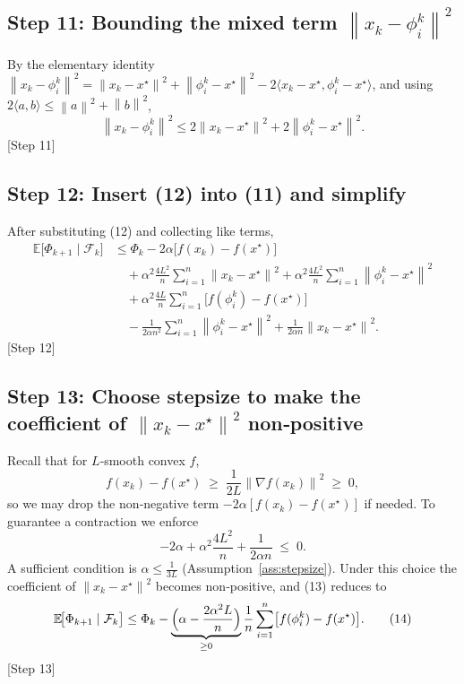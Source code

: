 \documentclass{article}
\newcommand{\E}{\mathbb{E}}
\newcommand{\norm}[1]{\left\|#1\right\|}
\newcommand{\grad}{\nabla}
\begin{document}
\subsection*{Step 11: Bounding the mixed term $\norm{x_k-\phi_i^k}^{2}$}
By the elementary identity
$\norm{x_k-\phi_i^k}^{2}
 = \norm{x_k-x^\star}^{2}
   +\norm{\phi_i^k-x^\star}^{2}
   -2\langle x_k-x^\star,\phi_i^k-x^\star\rangle$,
and using $2\langle a,b\rangle\le \norm{a}^{2}+\norm{b}^{2}$,
\[
\norm{x_k-\phi_i^k}^{2}
 \le 2\norm{x_k-x^\star}^{2}+2\norm{\phi_i^k-x^\star}^{2}. \tag{12}
\]
[Step 11]

\subsection*{Step 12: Insert (12) into (11) and simplify}
After substituting (12) and collecting like terms,
\[
\begin{aligned}
\E\!\bigl[\Phi_{k+1}\mid\mathcal{F}_k\bigr]
 &\le \Phi_k
   -2\alpha\bigl[f(x_k)-f(x^\star)\bigr] \\
 &\quad +\alpha^{2}\frac{4L^{2}}{n}\sum_{i=1}^{n}\norm{x_k-x^\star}^{2}
   +\alpha^{2}\frac{4L^{2}}{n}\sum_{i=1}^{n}\norm{\phi_i^k-x^\star}^{2}\\
 &\quad +\alpha^{2}\frac{4L}{n}\sum_{i=1}^{n}\bigl[f(\phi_i^k)-f(x^\star)\bigr] \\
 &\quad -\frac{1}{2\alpha n^{2}}\sum_{i=1}^{n}\norm{\phi_i^{k}-x^\star}^{2}
   +\frac{1}{2\alpha n}\norm{x_k-x^\star}^{2}.
\end{aligned} \tag{13}
\]
[Step 12]

\subsection*{Step 13: Choose stepsize to make the coefficient of
$\norm{x_k-x^\star}^{2}$ non‑positive}
Recall that for $L$‑smooth convex $f$,
\[
f(x_k)-f(x^\star)\;\ge\;\frac{1}{2L}\norm{\grad f(x_k)}^{2}
\;\ge\;0,
\]
so we may drop the non‑negative term $-2\alpha[f(x_k)-f(x^\star)]$ if needed.
To guarantee a contraction we enforce
\[
-2\alpha +\alpha^{2}\frac{4L^{2}}{n} +\frac{1}{2\alpha n}\;\le\;0.
\]
A sufficient condition is $\alpha\le\frac{1}{3L}$ (Assumption~\ref{ass:stepsize}).
Under this choice the coefficient of $\norm{x_k-x^\star}^{2}$ becomes
non‑positive, and (13) reduces to
\[
\E\!\bigl[\Phi_{k+1}\mid\mathcal{F}_k\bigr]
 \le \Phi_k
    -\underbrace{\Bigl(\alpha -\frac{2\alpha^{2}L}{n}\Bigr)}_{\ge 0}
      \frac{1}{n}\sum_{i=1}^{n}\bigl[f(\phi_i^k)-f(x^\star)\bigr]. \tag{14}
\]
[Step 13]
\end{document}
